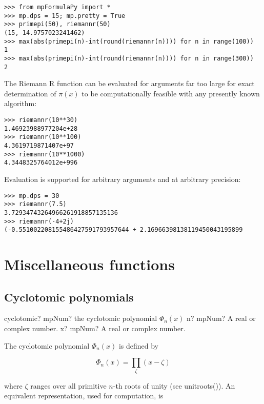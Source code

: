 \begin{lstlisting}
>>> from mpFormulaPy import *
>>> mp.dps = 15; mp.pretty = True
>>> primepi(50), riemannr(50)
(15, 14.9757023241462)
>>> max(abs(primepi(n)-int(round(riemannr(n)))) for n in range(100))
1
>>> max(abs(primepi(n)-int(round(riemannr(n)))) for n in range(300))
2
\end{lstlisting}

The Riemann R function can be evaluated for arguments far too large for exact determination of $\pi(x)$ to be computationally feasible with any presently known algorithm:

\begin{lstlisting}
>>> riemannr(10**30)
1.46923988977204e+28
>>> riemannr(10**100)
4.3619719871407e+97
>>> riemannr(10**1000)
4.3448325764012e+996
\end{lstlisting}

Evaluation is supported for arbitrary arguments and at arbitrary precision:

\begin{lstlisting}
>>> mp.dps = 30
>>> riemannr(7.5)
3.72934743264966261918857135136
>>> riemannr(-4+2j)
(-0.551002208155486427591793957644 + 2.16966398138119450043195899
\end{lstlisting}


\newpage
\section{Miscellaneous functions}

\subsection{Cyclotomic polynomials}

\begin{mpFunctionsExtract}
	\mpFunctionTwo
	{cyclotomic? mpNum? the cyclotomic polynomial $\Phi_n(x)$}
	{n? mpNum? A real or complex number.}
	{x? mpNum? A real or complex number.}		
\end{mpFunctionsExtract}

\vpara
The cyclotomic polynomial $\Phi_n(x)$ is defined by

\begin{equation}
\Phi_n(x) = \prod_{\zeta} (x-\zeta)
\end{equation}

where $\zeta$ ranges over all primitive $n$-th roots of unity (see unitroots()). An equivalent representation, used for computation, is

